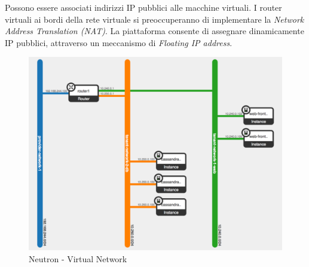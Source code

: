 \documentclass{article}
\begin{document}
Possono essere associati indirizzi IP pubblici alle macchine virtuali. I router virtuali ai bordi della rete virtuale si preoccuperanno di implementare la \textit{Network Address Translation (NAT)}. La piattaforma consente di assegnare dinamicamente IP pubblici, attraverso un meccanismo di \textit{Floating IP address}. 
\begin{figure}[H]
    \centering
    \includegraphics[scale=0.5]{img/neutron virtual network.png}
    \caption{Neutron - Virtual Network}
\end{figure}\noindent
\end{document}
